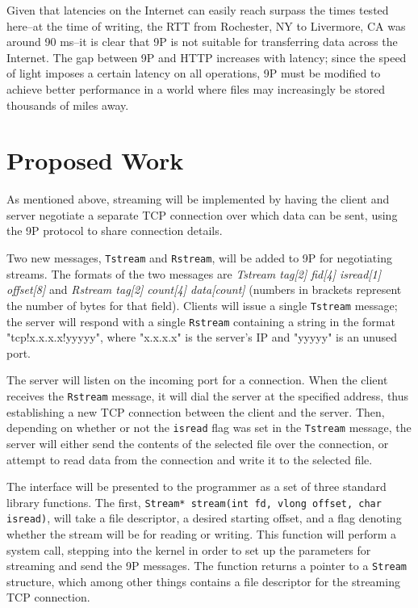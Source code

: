 \documentclass[12pt,american]{report}
\begin{document}
Given that latencies on the Internet can easily reach surpass the times tested here--at the time of writing, the RTT from Rochester, NY to Livermore, CA was around 90 ms--it is clear that 9P is not suitable for transferring data across the Internet. The gap between 9P and HTTP increases with latency; since the speed of light imposes a certain latency on all operations, 9P must be modified to achieve better performance in a world where files may increasingly be stored thousands of miles away.

\section{Proposed Work}
As mentioned above, streaming will be implemented by having the client and server negotiate a separate TCP connection over which data can be sent, using the 9P protocol to share connection details.

Two new messages, {\tt Tstream} and {\tt Rstream}, will be added to 9P for negotiating streams. The formats of the two messages are \emph{Tstream tag[2] fid[4] isread[1] offset[8]} and \emph{Rstream tag[2] count[4] data[count]} (numbers in brackets represent the number of bytes for that field). Clients will issue a single {\tt Tstream} message; the server will respond with a single {\tt Rstream} containing a string in the format "tcp!x.x.x.x!yyyyy", where "x.x.x.x" is the server's IP and "yyyyy" is an unused port.

The server will listen on the incoming port for a connection. When the client receives the {\tt Rstream} message, it will dial the server at the specified address, thus establishing a new TCP connection between the client and the server. Then, depending on whether or not the {\tt isread} flag was set in the {\tt Tstream} message, the server will either send the contents of the selected file over the connection, or attempt to read data from the connection and write it to the selected file.

The interface will be presented to the programmer as a set of three standard library functions. The first, {\tt Stream* stream(int fd, vlong offset, char isread)}, will take a file descriptor, a desired starting offset, and a flag denoting whether the stream will be for reading or writing. This function will perform a system call, stepping into the kernel in order to set up the parameters for streaming and send the 9P messages. The function returns a pointer to a {\tt Stream} structure, which among other things contains a file descriptor for the streaming TCP connection.
\end{document}
